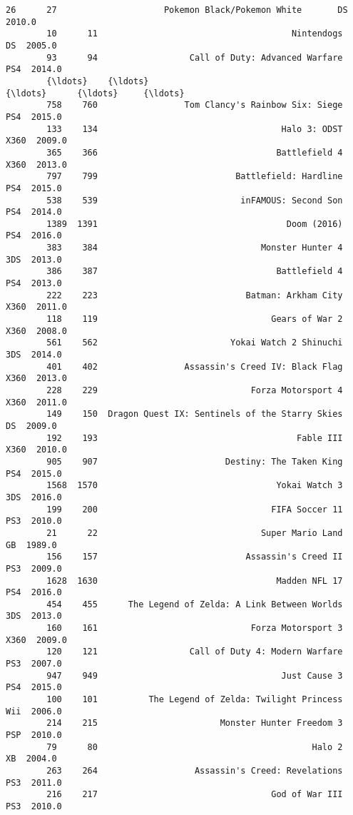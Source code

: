 \documentclass[11pt]{article}
\begin{document}
\begin{Verbatim}[commandchars=\\\{\}]
        26      27                     Pokemon Black/Pokemon White       DS  2010.0   
        10      11                                      Nintendogs       DS  2005.0   
        93      94                  Call of Duty: Advanced Warfare      PS4  2014.0   
        {\ldots}    {\ldots}                                             {\ldots}      {\ldots}     {\ldots}   
        758    760                 Tom Clancy's Rainbow Six: Siege      PS4  2015.0   
        133    134                                    Halo 3: ODST     X360  2009.0   
        365    366                                   Battlefield 4     X360  2013.0   
        797    799                           Battlefield: Hardline      PS4  2015.0   
        538    539                            inFAMOUS: Second Son      PS4  2014.0   
        1389  1391                                     Doom (2016)      PS4  2016.0   
        383    384                                Monster Hunter 4      3DS  2013.0   
        386    387                                   Battlefield 4      PS4  2013.0   
        222    223                             Batman: Arkham City     X360  2011.0   
        118    119                                  Gears of War 2     X360  2008.0   
        561    562                          Yokai Watch 2 Shinuchi      3DS  2014.0   
        401    402                 Assassin's Creed IV: Black Flag     X360  2013.0   
        228    229                              Forza Motorsport 4     X360  2011.0   
        149    150  Dragon Quest IX: Sentinels of the Starry Skies       DS  2009.0   
        192    193                                       Fable III     X360  2010.0   
        905    907                         Destiny: The Taken King      PS4  2015.0   
        1568  1570                                   Yokai Watch 3      3DS  2016.0   
        199    200                                  FIFA Soccer 11      PS3  2010.0   
        21      22                                Super Mario Land       GB  1989.0   
        156    157                             Assassin's Creed II      PS3  2009.0   
        1628  1630                                   Madden NFL 17      PS4  2016.0   
        454    455      The Legend of Zelda: A Link Between Worlds      3DS  2013.0   
        160    161                              Forza Motorsport 3     X360  2009.0   
        120    121                  Call of Duty 4: Modern Warfare      PS3  2007.0   
        947    949                                    Just Cause 3      PS4  2015.0   
        100    101          The Legend of Zelda: Twilight Princess      Wii  2006.0   
        214    215                        Monster Hunter Freedom 3      PSP  2010.0   
        79      80                                          Halo 2       XB  2004.0   
        263    264                   Assassin's Creed: Revelations      PS3  2011.0   
        216    217                                  God of War III      PS3  2010.0   
        

\end{Verbatim}
\end{document}
